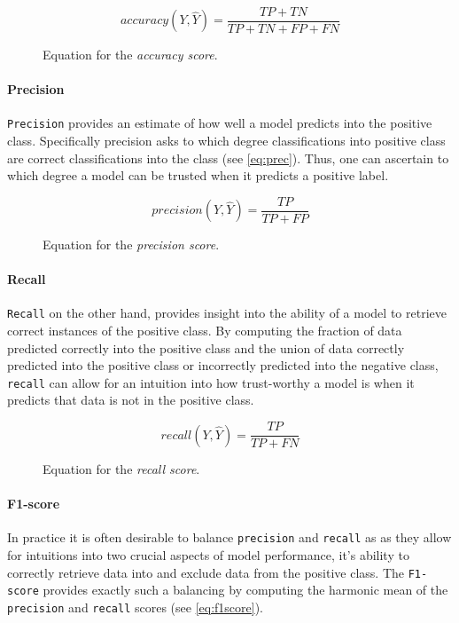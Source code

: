 \begin{figure}[h]
  \begin{equation}\label{eq:acc}
    accuracy(Y,\hat{Y}) = \frac{TP + TN}{TP + TN + FP + FN}
  \end{equation}
  \caption{Equation for the \textit{accuracy score}.}
\end{figure}

\paragraph{Precision}
\texttt{Precision} provides an estimate of how well a model predicts into the positive class.
Specifically precision asks to which degree classifications into positive class are correct classifications into the class (see \cref{eq:prec}). 
Thus, one can ascertain to which degree a model can be trusted when it predicts a positive label.

\begin{figure}[h]
  \begin{equation}\label{eq:prec}
    precision(Y,\hat{Y}) = \frac{TP}{TP + FP}
  \end{equation}
  \caption{Equation for the \textit{precision score}.}
\end{figure}

\paragraph{Recall}
\texttt{Recall} on the other hand, provides insight into the ability of a model to retrieve correct instances of the positive class.
By computing the fraction of data predicted correctly into the positive class and the union of data correctly predicted into the positive class or incorrectly predicted into the negative class, \texttt{recall} can allow for an intuition into how trust-worthy a model is when it predicts that data is not in the positive class.

\begin{figure}[h]
  \begin{equation}\label{eq:rec}
    recall(Y,\hat{Y}) = \frac{TP}{TP + FN}
  \end{equation}
  \caption{Equation for the \textit{recall score}.}
\end{figure}

\paragraph{F1-score}
In practice it is often desirable to balance \texttt{precision} and \texttt{recall} as as they allow for intuitions into two crucial aspects of model performance, it's ability to correctly retrieve data into and exclude data from the positive class. 
The \texttt{F1-score} provides exactly such a balancing by computing the harmonic mean of the \texttt{precision} and \texttt{recall} scores (see \cref{eq:f1score}).

